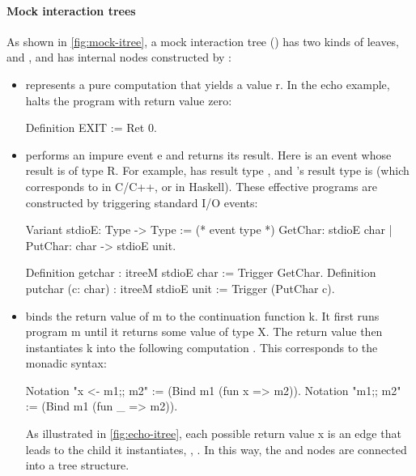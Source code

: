 \paragraph{Mock interaction trees}
As shown in \autoref{fig:mock-itree}, a mock interaction tree () has
two kinds of leaves,  and , and has internal nodes
constructed by :
\begin{itemize}
\item {} represents a pure computation that yields a value \ilc r.
  In the echo example,  halts the program with return value zero:
\begin{coq}
  Definition EXIT := Ret 0.
\end{coq}

\item {} performs an impure event \ilc e and returns its result.
  Here  is an event whose result is of type \ilc R.  For example,
   has result type , and 's result type is
   (which corresponds to  in C/C++, or \ilc{()} in
  Haskell).  These effective programs are constructed by triggering standard I/O
  events:
\begin{coq}
  Variant stdioE: Type -> Type := (* event type *)
    GetChar:         stdioE char
  | PutChar: char -> stdioE unit.
  
  Definition getchar           : itreeM stdioE char := Trigger  GetChar.
  Definition putchar (c: char) : itreeM stdioE unit := Trigger (PutChar c).
\end{coq}
\item {} binds the return value of \ilc m to the continuation
  function \ilc k.  It first runs program \ilc m until it returns some value of
  type \ilc X.  The return value  then instantiates \ilc k into the
  following computation .  This corresponds to the
  monadic \ilc{(;;)} syntax:
\begin{coq}
  Notation "x <- m1;; m2" := (Bind m1 (fun x => m2)).
  Notation "m1;; m2"      := (Bind m1 (fun _ => m2)).
\end{coq}

As illustrated in \autoref{fig:echo-itree}, each possible return value \ilc x is
an edge that leads to the child it instantiates, \ie, .  In this
way, the  and  nodes are connected into a tree
structure.
\end{itemize}

